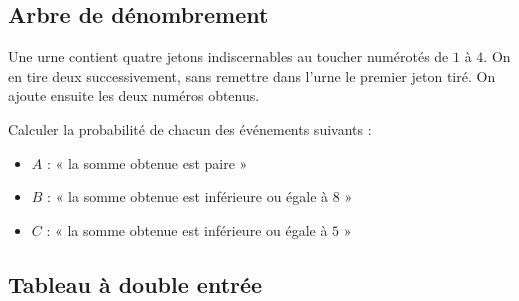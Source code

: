 \documentclass[11pt]{article}
\begin{document}
\subsection{Arbre de dénombrement}

\begin{app}
  Une urne contient quatre jetons indiscernables au toucher numérotés de $1$ à
  $4$. On en tire deux successivement, sans remettre dans l'urne le premier
  jeton tiré. On ajoute ensuite les deux numéros obtenus. 

  Calculer la probabilité de chacun des événements suivants :
  \begin{itemize}
    \item $A$ : « la somme obtenue est paire »
    \item $B$ : « la somme obtenue est inférieure ou égale à $8$ »
    \item $C$ : « la somme obtenue est inférieure ou égale à $5$ »
  \end{itemize}
\end{app}

\subsection{Tableau à double entrée}
\end{document}
